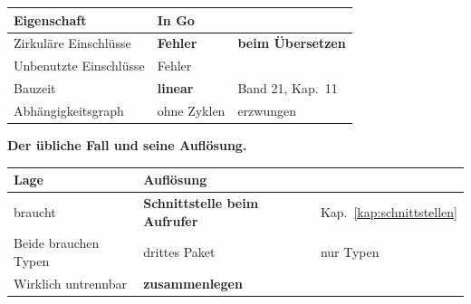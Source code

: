 \begin{merksatz}
\begin{center}
\renewcommand{\arraystretch}{1.5}
\begin{tabular}{@{}P{3.0cm}P{2.2cm}P{2.8cm}@{}}
\toprule
\textbf{Eigenschaft} & \textbf{In Go} & \\
\midrule
Zirkuläre Einschlüsse & \textcolor{akzent}{\textbf{Fehler}} & \textbf{beim Übersetzen}\\
Unbenutzte Einschlüsse & \textcolor{akzent}{Fehler} & \\
Bauzeit & \textcolor{gruen}{\textbf{linear}} & \textcolor{gruen}{Band 21, Kap.~11}\\
Abhängigkeits\-graph & \textcolor{gruen}{ohne Zyklen} & \textcolor{gruen}{erzwungen}\\
\bottomrule
\end{tabular}
\end{center}

\begin{center}
\begin{minipage}{0.88\textwidth}
\end{minipage}
\end{center}

\textbf{Der übliche Fall und seine Auflösung.}

\begin{center}
\renewcommand{\arraystretch}{1.45}
\begin{tabular}{@{}P{3.6cm}P{2.6cm}P{2.0cm}@{}}
\toprule
\textbf{Lage} & \textbf{Auflösung} & \\
\midrule
{} braucht  & \textbf{Schnittstelle beim Aufrufer} & \textcolor{gruen}{Kap.~\ref{kap:schnittstellen}}\\
Beide brauchen Typen & drittes Paket & \textcolor{gruen}{nur Typen}\\
Wirklich untrennbar & \textbf{zusammen\-legen} & \\
\bottomrule
\end{tabular}
\end{center}

\begin{center}
\end{center}


\end{merksatz}
